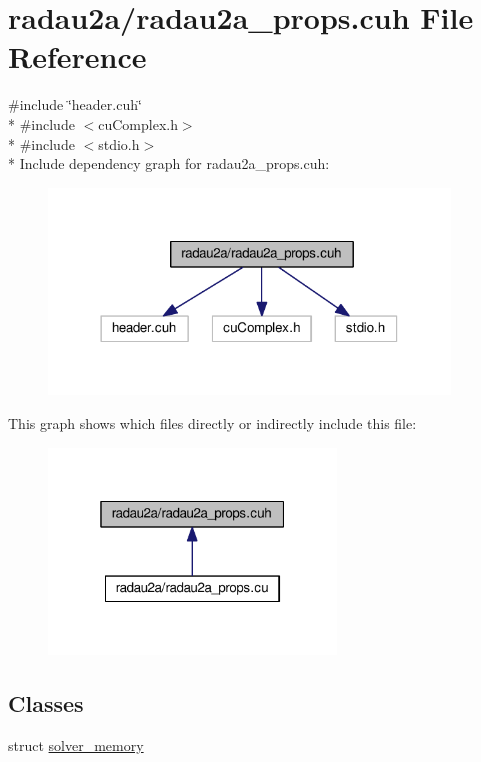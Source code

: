 \hypertarget{radau2a__props_8cuh}{}\section{radau2a/radau2a\+\_\+props.cuh File Reference}
\label{radau2a__props_8cuh}
{\ttfamily \#include \char`\"{}header.\+cuh\char`\"{}}\\*
{\ttfamily \#include $<$cu\+Complex.\+h$>$}\\*
{\ttfamily \#include $<$stdio.\+h$>$}\\*
Include dependency graph for radau2a\+\_\+props.\+cuh\+:\nopagebreak
\begin{figure}[H]
\begin{center}
\leavevmode
\includegraphics[width=302pt]{radau2a__props_8cuh__incl}
\end{center}
\end{figure}
This graph shows which files directly or indirectly include this file\+:\nopagebreak
\begin{figure}[H]
\begin{center}
\leavevmode
\includegraphics[width=217pt]{radau2a__props_8cuh__dep__incl}
\end{center}
\end{figure}
\subsection*{Classes}
\begin{DoxyCompactItemize}
\item 
struct \hyperlink{structsolver__memory}{solver\+\_\+memory}
\end{DoxyCompactItemize}

